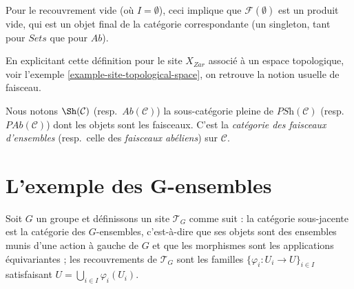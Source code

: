\begin{remark}
\label{remark-empty-covering}
Pour le recouvrement vide (o\`u $I = \emptyset$), ceci implique que
$\mathcal{F}(\emptyset)$ est un produit vide, qui est un objet final de la
cat\'egorie correspondante (un singleton, tant pour $\textit{Sets}$ que pour
$\textit{Ab}$).
\end{remark}

\begin{example}
\label{example-sheaf-site-space}
En explicitant cette d\'efinition pour le site $X_{Zar}$ associ\'e \`a un espace
topologique, voir l'exemple \ref{example-site-topological-space}, on retrouve la notion usuelle
de faisceau.
\end{example}

\begin{definition}
\label{definition-category-sheaves}
Nous notons $\Sh(\mathcal{C})$ (resp.\ $\textit{Ab}(\mathcal{C})$)
la sous-cat\'egorie pleine de $\textit{PSh}(\mathcal{C})$
(resp.\ $\textit{PAb}(\mathcal{C})$) dont les objets sont les faisceaux. C'est la
{\it cat\'egorie des faisceaux d'ensembles} (resp.\ celle des {\it faisceaux ab\'eliens}) sur
$\mathcal{C}$.
\end{definition}




\section{L'exemple des G-ensembles}
\label{section-G-sets}

\noindent
Soit $G$ un groupe et d\'efinissons un site $\mathcal{T}_G$ comme suit : la cat\'egorie
sous-jacente est la cat\'egorie des $G$-ensembles, c'est-\`a-dire que ses objets sont des ensembles munis
d'une action \`a gauche de $G$ et que les morphismes sont les applications \'equivariantes ; les
recouvrements de $\mathcal{T}_G$ sont les familles
$\{\varphi_i : U_i \to U\}_{i\in I}$ satisfaisant
$U = \bigcup_{i\in I} \varphi_i(U_i)$.

